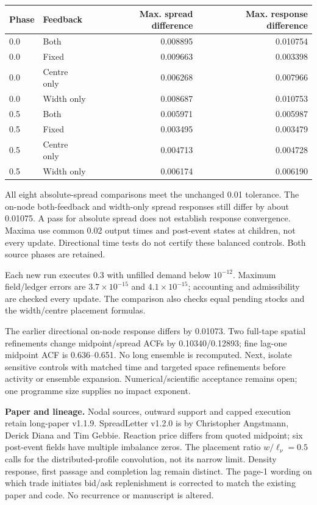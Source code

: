 \documentclass[11pt,a4paper]{article}
\begin{document}
\begin{center}\begin{tabular}{llrr}
\toprule
Phase & Feedback & Max. spread difference & Max. response difference\\
\midrule
0.0 & Both & 0.008895 & 0.010754 \\
0.0 & Fixed & 0.009663 & 0.003398 \\
0.0 & Centre only & 0.006268 & 0.007966 \\
0.0 & Width only & 0.008687 & 0.010753 \\
0.5 & Both & 0.005971 & 0.005987 \\
0.5 & Fixed & 0.003495 & 0.003479 \\
0.5 & Centre only & 0.004713 & 0.004728 \\
0.5 & Width only & 0.006174 & 0.006190 \\
\bottomrule
\end{tabular}\end{center}
All eight absolute-spread comparisons meet the unchanged 0.01 tolerance.
The on-node both-feedback and width-only spread responses still differ by
about 0.01075. A pass for absolute spread does not establish response
convergence. Maxima use common 0.02 output times and post-event states at
children, not every update. Directional time tests do not certify these
balanced controls. Both source phases are retained.

Each new run executes 0.3 with unfilled demand below $10^{-12}$. Maximum
field/ledger errors are $3.7\times10^{-15}$ and $4.1\times10^{-15}$;
accounting and admissibility are checked every update. The comparison also
checks equal pending stocks and the width/centre placement formulas.

The earlier directional on-node response differs by 0.01073. Two full-tape
spatial refinements change midpoint/spread ACFs by 0.10340/0.12893;
fine lag-one midpoint ACF is 0.636--0.651. No long ensemble is recomputed.
Next, isolate sensitive controls with matched time and targeted space
refinements before activity or ensemble expansion. Numerical/scientific
acceptance remains open; one programme size supplies no impact exponent.

\textbf{Paper and lineage.} Nodal sources, outward support and capped
execution retain long-paper v1.1.9. SpreadLetter v1.2.0 is by Christopher
Angstmann, Derick Diana and Tim Gebbie. Reaction price differs from quoted
midpoint; six post-event fields have multiple imbalance zeros. The placement
ratio $w/\ell_\nu=0.5$ calls for the distributed-profile convolution, not its
narrow limit. Density response, first passage and completion lag remain distinct.
The page-1 wording on which trade initiates bid/ask replenishment is corrected
to match the existing paper and code. No recurrence or manuscript is altered.
\end{document}
